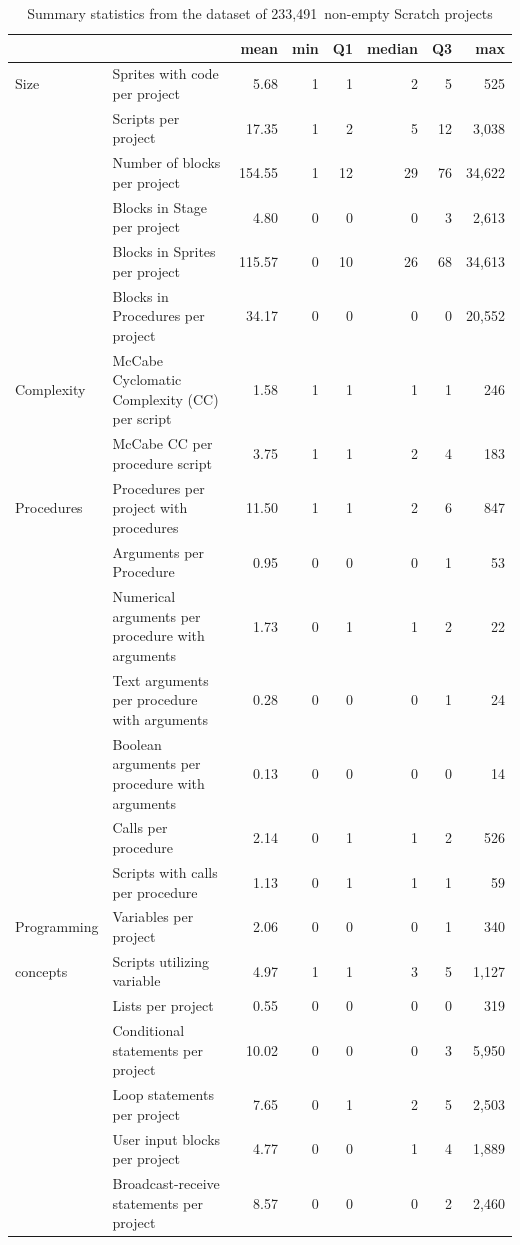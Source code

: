 \documentclass{sig-alternate}
\newcommand{\nScriptPrograms}{233,491}
\begin{document}
\begin{table}[ht]
	\centering
	\begin{tabular}{llrrrrrr}
		&&\textbf{mean}&\textbf{min}&\textbf{Q1}&\textbf{median}&\textbf{Q3}&\textbf{max}\\
		\hline
		Size&Sprites with code per project&5.68&1&1&2&5&525\\
		&Scripts per project&17.35&1&2&5&12&3,038\\
		&Number of blocks per project&154.55&1&12&29&76&34,622\\
		&Blocks in Stage per project&4.80&0&0&0&3&2,613\\
		&Blocks in Sprites per project&115.57&0&10&26&68&34,613\\
		&Blocks in Procedures per project&34.17&0&0&0&0&20,552\\
		\hline
		Complexity&McCabe Cyclomatic Complexity (CC) per script&1.58&1&1&1&1&246\\
		&McCabe CC per procedure script&3.75&1&1&2&4&183\\
		\hline
		Procedures&Procedures per project with procedures&11.50&1&1&2&6&847\\
		&Arguments per Procedure&0.95&0&0&0&1&53\\
		&Numerical arguments per procedure with arguments&1.73&0&1&1&2&22\\
		&Text arguments per procedure with arguments&0.28&0&0&0&1&24\\
		&Boolean arguments per procedure with arguments&0.13&0&0&0&0&14\\
		&Calls per procedure&2.14&0&1&1&2&526\\
		&Scripts with calls per procedure&1.13&0&1&1&1&59\\
		\hline
		Programming&Variables per project&2.06&0&0&0&1&340\\
		concepts&Scripts utilizing variable&4.97&1&1&3&5&1,127\\
		&Lists per project&0.55&0&0&0&0&319\\
		&Conditional statements per project&10.02&0&0&0&3&5,950\\
		&Loop statements per project&7.65&0&1&2&5&2,503\\
		&User input blocks per project&4.77&0&0&1&4&1,889\\
		&Broadcast-receive statements per project&8.57&0&0&0&2&2,460\\	
		\hline
	\end{tabular}
	\caption{Summary statistics from the dataset of \nScriptPrograms~non-empty Scratch projects}
	\label{tbl-size}
\end{table}
\end{document}
